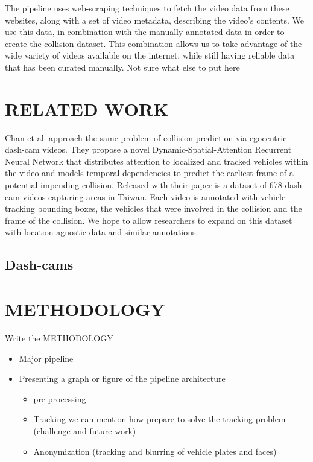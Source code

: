 \documentclass[letterpaper, 10 pt, conference]{IEEEconf}
\newcommand{\todo}[1]{{\color{red}#1}}
\begin{document}
The pipeline uses web-scraping techniques to fetch the video data from these websites, along with a set of video metadata, describing the video's contents.
We use this data, in combination with the manually annotated data in order to create the collision dataset.
This combination allows us to take advantage of the wide variety of videos available on the internet, while still having reliable data that has been curated manually.
\todo{Not sure what else to put here}



\section{RELATED WORK}

Chan et al.  \cite{chan2016anticipating} approach the same problem of collision prediction via egocentric dash-cam videos. They propose a novel Dynamic-Spatial-Attention Recurrent Neural Network that distributes attention to localized and tracked vehicles within the video and models temporal dependencies to predict the earliest frame of a potential impending collision. Released with their paper is a dataset of 678 dash-cam videos capturing areas in Taiwan. Each video is annotated with vehicle tracking bounding boxes, the vehicles that were involved in the collision and the frame of the collision. We hope to allow researchers to expand on this dataset with location-agnostic data and similar annotations.



\subsection{Dash-cams}%
\label{sub:dash_cams}







\section{METHODOLOGY}

\todo{Write the METHODOLOGY}
\begin{itemize}
  \item Major pipeline
  \item Presenting a graph or figure of the pipeline architecture
  \begin{itemize}
    \item pre-processing
    \item Tracking we can mention how prepare to solve the tracking problem (challenge and future work)
    \item Anonymization (tracking and blurring of vehicle plates and faces)
  \end{itemize}
\end{itemize}
\end{document}
